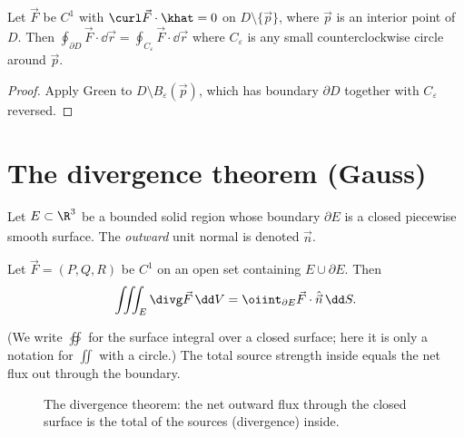 \begin{theorem}\label{thm:greensing}
Let $\vec F$ be $C^1$ with $\curl\vec F\cdot\khat=0$ on $D\setminus\{\vec p\}$, where $\vec p$ is an interior point of $D$. Then $\oint_{\partial D}\vec F\cdot\dd\vec r=\oint_{C_\varepsilon}\vec F\cdot\dd\vec r$ where $C_\varepsilon$ is any small counterclockwise circle around $\vec p$.
\end{theorem}

\begin{proof}
Apply Green to $D\setminus B_\varepsilon(\vec p)$, which has boundary $\partial D$ together with $C_\varepsilon$ reversed.
\end{proof}

\section{The divergence theorem (Gauss)}

Let $E\subset\R^3$ be a bounded solid region whose boundary $\partial E$ is a closed piecewise smooth surface. The \emph{outward} unit normal is denoted $\hat{\vec n}$.

\begin{theorem}\label{thm:gauss}
Let $\vec F=(P,Q,R)$ be $C^1$ on an open set containing $E\cup\partial E$. Then
\[
\iiint_E\divg\vec F\,\dd V=\oiint_{\partial E}\vec F\cdot\hat{\vec n}\,\dd S .
\]
\end{theorem}

(We write $\oiint$ for the surface integral over a closed surface; here it is only a notation for $\iint$ with a circle.) The total source strength inside equals the net flux out through the boundary.

\begin{figure}[ht]
\centering
{}
\caption{The divergence theorem: the net outward flux through the closed surface is the total of the sources (divergence) inside.}
\label{fig:gauss}
\end{figure}

